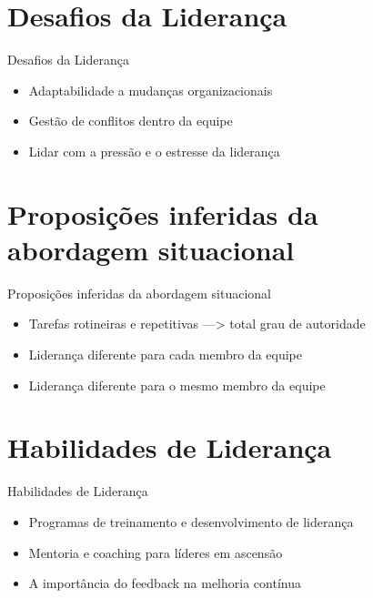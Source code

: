 \documentclass[aspectratio=169,xcolor=dvipsnames]{beamer}
\begin{document}
\section{Desafios da Liderança}

\begin{frame}{Desafios da Liderança}
	\begin{itemize}
		\item Adaptabilidade a mudanças organizacionais
		\item Gestão de conflitos dentro da equipe
		\item Lidar com a pressão e o estresse da liderança

	\end{itemize}
\end{frame}

\section{Proposições inferidas da abordagem situacional}

\begin{frame}{Proposições inferidas da abordagem situacional}
	\begin{itemize}
		\item Tarefas rotineiras e repetitivas ---> total grau de autoridade
		\item Liderança diferente para cada membro da equipe
		\item Liderança diferente para o mesmo membro da equipe
	\end{itemize}
\end{frame}

\section{Habilidades de Liderança}

\begin{frame}{Habilidades de Liderança}
	\begin{itemize}
		\item Programas de treinamento e desenvolvimento de liderança
		\item Mentoria e coaching para líderes em ascensão
		\item A importância do feedback na melhoria contínua

	\end{itemize}
\end{frame}
\end{document}
